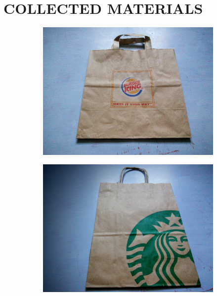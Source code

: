 \section{COLLECTED MATERIALS}

\begin{figure}
    \centering
    \begin{subfigure}[t]{0.47\textwidth}
        \includegraphics[width=\textwidth]{project_graphics/collected1.jpg}
    \end{subfigure}
    \begin{subfigure}[t]{0.47\textwidth}
        \includegraphics[width=\textwidth]{project_graphics/collected2.jpg}
    \end{subfigure}
    \label{fig:CollectedMaterials1}
\end{figure}